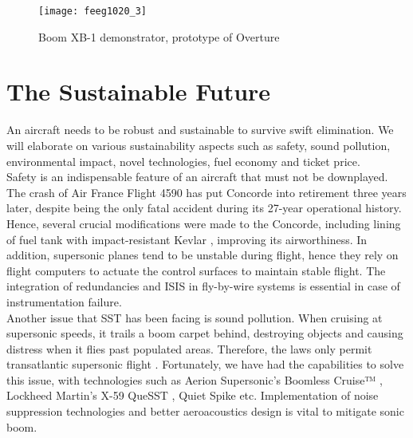 \documentclass[a4paper,11pt]{article}
\begin{document}
\vspace{1cm}

\begin{figure}[h] 
\texttt{[image: feeg1020\_3]}
\centering
\caption{Boom XB-1 demonstrator, prototype of Overture \cite{picture3}}
\end{figure}

\newpage

\section{The Sustainable Future}

An aircraft needs to be robust and sustainable to survive swift elimination. We will elaborate on various sustainability aspects such as safety, sound pollution, environmental impact, novel technologies, fuel economy and ticket price.\\

Safety is an indispensable feature of an aircraft that must not be downplayed. The crash of Air France Flight 4590 has put Concorde into retirement three years later, despite being the only fatal accident during its 27-year operational history. Hence, several crucial modifications were made to the Concorde, including lining of fuel tank with impact-resistant Kevlar \cite{concordesafety}, improving its airworthiness. In addition, supersonic planes tend to be unstable during flight, hence they rely on flight computers to actuate the control surfaces to maintain stable flight. The integration of redundancies and ISIS in fly-by-wire systems is essential in case of instrumentation failure.\\

Another issue that SST has been facing is sound pollution. When cruising at supersonic speeds, it trails a boom carpet behind, destroying objects and causing distress when it flies past populated areas. Therefore, the laws only permit transatlantic supersonic flight \cite{mercatus}. Fortunately, we have had the capabilities to solve this issue, with technologies such as Aerion Supersonic's Boomless Cruise™ \cite{cnbc}, Lockheed Martin's X-59 QueSST \cite{quesst}, Quiet Spike \cite{quietspike} etc. Implementation of noise suppression technologies and better aeroacoustics design is vital to mitigate sonic boom.\\

\vspace{0.5cm} 
\end{document}
